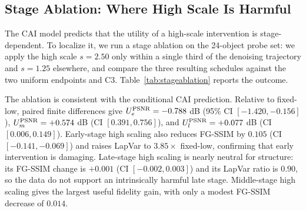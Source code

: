 \documentclass[times,twocolumn,final]{elsarticle}
\begin{document}
\subsection{Stage Ablation: Where High Scale Is Harmful}
\label{subsec:stageablation}

The CAI model predicts that the utility of a high-scale intervention is stage-dependent. To localize it, we run a stage ablation on the 24-object probe set: we apply the high scale $s = 2.50$ only within a single third of the denoising trajectory and $s = 1.25$ elsewhere, and compare the three resulting schedules against the two uniform endpoints and C3. Table~\ref{tab:stageablation} reports the outcome.

\begin{table}[t]
\centering
\caption{Stage ablation on the 24-object probe set (Section~\ref{subsec:setup}). ``High'' denotes $s = 2.50$ applied in the indicated third of the denoising trajectory, with $s = 1.25$ in the remaining steps. FG-Lap Var is the foreground Laplacian variance (an elevated value here indicates injected high-frequency response) and MAE the foreground mean absolute error. Early-stage high scaling reproduces the structural damage and artifact amplification of uniform high scaling; late-stage high scaling preserves structure but does not recover signal fidelity; concentrating the high scale in the middle stage (C3) achieves the best fidelity.}
\label{tab:stageablation}
\end{table}

The ablation is consistent with the conditional CAI prediction. Relative to fixed-low, paired finite differences give $U_e^{\rm PSNR}=-0.788$ dB (95\% CI $[-1.420,-0.156]$), $U_m^{\rm PSNR}=+0.574$ dB (CI $[0.391,0.756]$), and $U_l^{\rm PSNR}=+0.077$ dB (CI $[0.006,0.149]$). Early-stage high scaling also reduces FG-SSIM by $0.105$ (CI $[-0.141,-0.069]$) and raises LapVar to $3.85\times$ fixed-low, confirming that early intervention is damaging. Late-stage high scaling is nearly neutral for structure: its FG-SSIM change is $+0.001$ (CI $[-0.002,0.003]$) and its LapVar ratio is $0.90$, so the data do not support an intrinsically harmful late stage. Middle-stage high scaling gives the largest useful fidelity gain, with only a modest FG-SSIM decrease of $0.014$.
\end{document}
